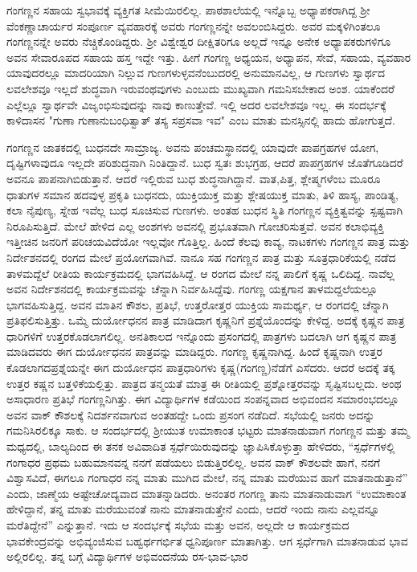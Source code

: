 {\smallskip
ಗಂಗಣ್ಣನ ಸಹಾಯ ಸ್ವಭಾವಕ್ಕೆ ವ್ಯಕ್ತಿಗತ ಸೀಮೆಯಿರಲಿಲ್ಲ. ಪಾಠಶಾಲೆಯಲ್ಲಿ ಇನ್ನೊಬ್ಬ ಅಧ್ಯಾಪಕರಾಗಿದ್ದ ಶ್ರೀ ವೆಂಕಣ್ಣಾಚಾರ್ಯರ ಸಂಪೂರ್ಣ ವ್ಯವಹಾ\-ರಕ್ಕೆ  ಅವರು \hbox{ಗಂಗಣ್ಣನನ್ನೇ} ಅವಲಂಬಿಸಿದ್ದರು. ಅವರ ಮಕ್ಕಳಿಗಿಂತಲೂ ಗಂಗಣ್ಣನನ್ನೇ ಅವರು ನೆಚ್ಚಿ\-ಕೊಂಡಿದ್ದರು. ಶ್ರೀ ವಿಶ್ವೇಶ್ವರ ದೀಕ್ಷಿತರಿಗೂ ಅಲ್ಲದೆ ಇನ್ನೂ ಅನೇಕ ಅಧ್ಯಾಪಕರು\-ಗಳಿಗೂ ಅವನ ಸೇವಾರೂಪದ ಸಹಾಯ ಹಸ್ತ ಇದ್ದೇ ಇತ್ತು.  ಹೀಗೆ ಗಂಗಣ್ಣ ಅಧ್ಯಯನ, ಅಧ್ಯಾಪನ, ಸೇವೆ, ಸಹಾಯ, ವ್ಯವಹಾರ ಯಾವುದರಲ್ಲೂ ಮಾದರಿ\-ಯಾಗಿ ನಿಲ್ಲುವ ಗುಣಗ\-ಳುಳ್ಳವನೆಂಬುದರಲ್ಲಿ ಅನುಮಾನವಿಲ್ಲ, ಆ ಗುಣಗಳು ಸ್ವಾರ್ಥದ ಲವಲೇಶವೂ ಇಲ್ಲದೆ ಶುದ್ಧವಾಗಿ ಇರುವಂಥವುಗಳು ಎಂಬುದು  ಮುಖ್ಯವಾಗಿ ಗಮನಿಸಬೇಕಾದ ಅಂಶ. ಯಾಕೆಂದರೆ ಎಲ್ಲೆಲ್ಲೂ ಸ್ವಾರ್ಥವೇ ವಿಜೃಂಭಿಸುವುದನ್ನು ನಾವು ಕಾಣುತ್ತೇವೆ. ಇಲ್ಲಿ ಅದರ ಲವಲೇಶವೂ ಇಲ್ಲ.  ಈ ಸಂದರ್ಭಕ್ಕೆ ಕಾಳಿದಾಸನ \enginline{-} "\hbox{ಗುಣಾ} ಗುಣಾನುಬಂಧಿತ್ವಾತ್ ತಸ್ಯ ಸಪ್ರಸವಾ ಇವ" ಎಂಬ ಮಾತು ಮನಸ್ಸಿನಲ್ಲಿ ಹಾದು ಹೋಗುತ್ತದೆ. 

ಗಂಗಣ್ಣನ ಜಾತಕದಲ್ಲಿ  ಬುಧನದೇ ಸಾಮ್ರಾಜ್ಯ. ಅವನು ಪಂಚಮಸ್ಥಾನದಲ್ಲಿ  ಯಾವುದೇ ಪಾಪಗ್ರಹಗಳ ಯೋಗ, ದೃಷ್ಟಿಗಳಾವುದೂ ಇಲ್ಲದೇ ಪರಿಶುದ್ಧನಾಗಿ \hbox{ನಿಂತಿದ್ದಾನೆ.}  ಬುಧ ಸ್ವತಃ ಶುಭಗ್ರಹ, ಆದರೆ ಪಾಪಗ್ರಹಗಳ ಜೊತೆಗೂಡಿದರೆ \hbox{ಅವನೂ} ಪಾಪನಾಗಿಬಿಡುತ್ತಾನೆ. ಆದರೆ ಇಲ್ಲಿರುವ ಬುಧ ಶುದ್ಧನಾಗಿದ್ದಾನೆ. ವಾತ,ಪಿತ್ತ, ಶ್ಲೇಷ್ಮ\-ಗಳೆಂಬ ಮೂರೂ ಧಾತುಗಳ ಸಮಾನ ಹದವುಳ್ಳ ಪ್ರಕೃತಿ ಬುಧನದು, \hbox{ಯುಕ್ತಿಯುಕ್ತ} ಮತ್ತು ಶ್ಲೇಷಯುಕ್ತ ಮಾತು, ತಿಳಿ ಹಾಸ್ಯ, ಪಾಂಡಿತ್ಯ, ಕಲಾ ನೈಪುಣ್ಯ, ಸ್ನೇಹ ಇವೆಲ್ಲ ಬುಧ ಸೂಚಿ\-ಸುವ ಗುಣಗಳು. ಅಂತಹ ಬುಧನ ಸ್ಥಿತಿ ಗಂಗಣ್ಣನ ವ್ಯಕ್ತಿತ್ವವನ್ನು ಸ್ಪಷ್ಟವಾಗಿ ನಿರೂಪಿ\-ಸುತ್ತಿದೆ. ಮೇಲೆ ಹೇಳಿದ ಎಲ್ಲ ಅಂಶಗಳು ಅವನಲ್ಲಿ \hbox{ಪ್ರಭೂತವಾಗಿ} \hbox{ಗೋಚರಿಸುತ್ತವೆ}. ಅವನ ಕಲಾಭಿವ್ಯಕ್ತಿ ಇತ್ತೀಚಿನ ಜನರಿಗೆ ಪರಿಚಯವಿದೆಯೋ ಇಲ್ಲವೋ ಗೊತ್ತಿಲ್ಲ. ಹಿಂದೆ ಕೆಲವು ಕಾವ್ಯ, ನಾಟಕಗಳು \hbox{ಗಂಗಣ್ಣನ} ಪಾತ್ರ ಮತ್ತು ನಿರ್ದೇಶನದಲ್ಲಿ ರಂಗದ ಮೇಲೆ ಪ್ರಯೋಗವಾಗಿವೆ. ನಾನೂ ಸಹ \hbox{ಗಂಗಣ್ಣನ} ಪಾತ್ರ ಮತ್ತು ಸೂತ್ರಧಾರಿಕೆಯಲ್ಲಿ ನಡೆದ ತಾಳಮದ್ದೆಲೆ ರೀತಿಯ ಕಾರ್ಯಕ್ರಮದಲ್ಲಿ ಭಾಗವಹಿಸಿದ್ದೆ. ಆ ರಂಗದ ಮೇಲೆ ನನ್ನ ಪಾಲಿಗೆ ಕೃಷ್ಣ ಒಲಿದಿದ್ದ.  ನಾವೆಲ್ಲ ಅವನ \hbox{ನಿರ್ದೇಶನದಲ್ಲಿ} ಕಾರ್ಯಕ್ರಮವನ್ನು ಚೆನ್ನಾಗಿ ನಿರ್ವಹಿಸಿದ್ದೆವು. ಗಂಗಣ್ಣ ಯಕ್ಷಗಾನ ತಾಳಮದ್ದಲೆಯಲ್ಲೂ ಭಾಗವಹಿಸುತ್ತಿದ್ದ. ಅವನ ಮಾತಿನ ಕೌಶಲ, ಪ್ರತಿಭೆ, \hbox{ಉತ್ತರೋತ್ತರ} \hbox{ಯುಕ್ತಿಯ} ಸಾಮರ್ಥ್ಯ, ಆ ರಂಗದಲ್ಲಿ ಚೆನ್ನಾಗಿ ಪ್ರತಿಫಲಿಸುತ್ತಿತ್ತು. ಒಮ್ಮೆ \hbox{ದುರ್ಯೋಧನನ} ಪಾತ್ರ ಮಾಡಿದಾಗ ಕೃಷ್ಣನಿಗೆ ಪ್ರಶ್ನೆಯೊಂದನ್ನು ಕೇಳಿದ್ದ. ಅದಕ್ಕೆ ಕೃಷ್ಣನ ಪಾತ್ರ ಧಾರಿಗಳಿಗೆ ಉತ್ತರಕೊಡಲಾಗಲಿಲ್ಲ. ಅನತಿಕಾಲದ ಇನ್ನೊಂದು ಪ್ರಸಂಗ\-ದಲ್ಲಿ \hbox{ಪಾತ್ರಗಳು} ಬದಲಾಗಿ ಆಗ ಕೃಷ್ಣನ ಪಾತ್ರ ಮಾಡಿದವರು ಈಗ ದುರ್ಯೋಧನನ ಪಾತ್ರವನ್ನು ಮಾಡಿದ್ದರು. ಗಂಗಣ್ಣ ಕೃಷ್ಣನಾಗಿದ್ದ. ಹಿಂದೆ ಕೃಷ್ಣನಾಗಿ ಉತ್ತರ ಕೊಡಲಾಗದ\break ಪ್ರಶ್ನೆಯನ್ನೇ ಈಗ ದುರ್ಯೋಧನ ಪಾತ್ರಧಾರಿಗಳು ಕೃಷ್ಣ(ಗಂಗಣ್ಣ)ನೆಡೆಗೆ ಎಸೆದರು. ಆದರೆ ಅದಕ್ಕೆ ತಕ್ಕ ಉತ್ತರ ಕಷ್ಣನ ಬತ್ತಳಿಕೆಯಲ್ಲಿತ್ತು. ಪಾತ್ರದ ತನ್ಮಯತೆ ಮಾತ್ರ ಈ ರೀತಿಯಲ್ಲಿ ಪ್ರಶ್ನೋತ್ತರವನ್ನು ಸೃಷ್ಟಿಸಬಲ್ಲದು. ಅಂಥ ಅಸಾಧಾರಣ ಪ್ರತಿಭೆ \hbox{ಗಂಗಣ್ಣನಿಗಿತ್ತು.} ಈಗ ವಿದ್ಯಾರ್ಥಿಗಳ ಕಡೆಯಿಂದ ಸಂಪನ್ನವಾದ ಅಭಿವಂದನ ಸಮಾರಂಭದಲ್ಲೂ  ಅವನ ವಾಕ್ ಕೌಶಲಕ್ಕೆ ನಿದರ್ಶನವಾಗುವ ಅಂತಹದ್ದೇ ಒಂದು ಪ್ರಸಂಗ ನಡೆದಿದೆ. ಸಭೆಯಲ್ಲಿ ಜನರು ಅದನ್ನು ಗಮನಿಸಿರಲಿಕ್ಕೂ ಸಾಕು. ಆ ಸಂದರ್ಭದಲ್ಲಿ  ಶ್ರೀಯುತ ಉಮಾಕಾಂತ ಭಟ್ಟರು ಮಾತನಾಡುವಾಗ ಗಂಗಣ್ಣನ ಮತ್ತು ತಮ್ಮ ಮಧ್ಯದಲ್ಲಿ, ಬಾಲ್ಯದಿಂದ ಈ ತನಕ ಅವಿವಾದಿತ ಸ್ಪರ್ಧೆಯಿರುವುದನ್ನು ಜ್ಞಾಪಿಸಿಕೊಳ್ಳುತ್ತಾ ಹೇಳಿದರು, “ಸ್ಪರ್ಧೆಗಳಲ್ಲಿ \hbox{ಗಂಗಾಧರ} ಪ್ರಥಮ ಬಹುಮಾನವನ್ನ ನನಗೆ ಪಡೆಯಲು ಬಿಡುತ್ತಿರಲಿಲ್ಲ. ಅವನ ವಾಕ್ \hbox{ಕೌಶಲವೇ} ಹಾಗೆ, ನನಗೆ ವಿಶ್ವಾಸವಿದೆ, ಈಗಲೂ ಗಂಗಾಧರ ನನ್ನ ಮಾತು ಮುಗಿದ ಮೇಲೆ, ನನ್ನ ಮಾತು ಮರೆಯುವ ಹಾಗೆ ಮಾತನಾಡುತ್ತಾನೆ” ಎಂದು, ಜಾಣ್ಮೆಯ ಅಷ್ಟೇ\break ಚೋದ್ಯವಾದ ಮಾತನ್ನಾಡಿದರು. ಅನಂತರ ಗಂಗಣ್ಣ ತಾನು ಮಾತನಾಡುವಾಗ\enginline{-} “ಉಮಾಕಾಂತ ಹೇಳಿದ್ದಾನೆ, ತನ್ನ ಮಾತು ಮರೆಯುವಂತೆ ನಾನು ಮಾತನಾಡುತ್ತೇನೆ ಎಂದು, ಆದರೆ ಇಂದು ನಾನು ಎಲ್ಲವನ್ನೂ ಮರೆತಿದ್ದೇನೆ” ಎನ್ನುತ್ತಾನೆ. ಇದು ಆ ಸಂದರ್ಭಕ್ಕೆ ಸಭೆಯ ಮತ್ತು ಅವನ, ಅಲ್ಲದೇ ಆ ಕಾರ್ಯಕ್ರಮದ ಭಾವಕೇಂದ್ರವನ್ನು ಅಭಿವ್ಯಂಜಿಸುವ ಬಹ್ವರ್ಥಗರ್ಭಿತ ಧ್ವನಿಪೂರ್ಣ ಮಾತಾಗಿತ್ತು. ಆಗ ಸ್ಪರ್ಧೆಗಾಗಿ ಮಾತನಾಡುವ ಭಾವ ಅಲ್ಲಿರಲಿಲ್ಲ. ತನ್ನ ಬಗ್ಗೆ ವಿದ್ಯಾರ್ಥಿಗಳ ಅಭಿವಂದನೆಯ ರಸ-ಭಾವ-ಭಾರ }
